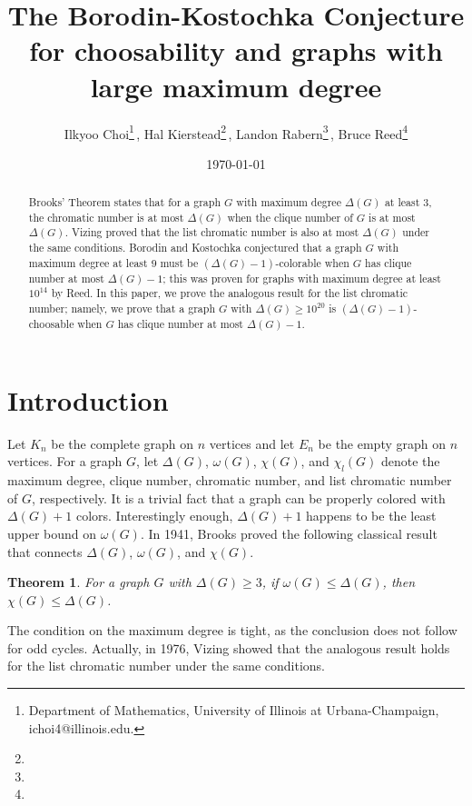\documentclass[12pt]{article}
\newtheorem{theorem}{Theorem}[section]
\theoremstyle{definition}
\begin{document}
\title{The Borodin-Kostochka Conjecture for choosability and graphs with large maximum degree}
\author{
Ilkyoo Choi\thanks{Department of Mathematics, University of Illinois at Urbana-Champaign, ichoi4@illinois.edu.}\,,
Hal Kierstead\thanks{}\,,
Landon Rabern\thanks{}\,,
Bruce Reed\thanks{}
}
\date\today
\maketitle
\begin{abstract}
Brooks' Theorem states that for a graph $G$ with maximum degree $\Delta(G)$ at least $3$, the chromatic number is at most $\Delta(G)$ when the clique number of $G$ is at most $\Delta(G)$. 
Vizing proved that the list chromatic number is also at most $\Delta(G)$ under the same conditions.
Borodin and Kostochka conjectured that a graph $G$ with maximum degree at least $9$ must be $(\Delta(G)-1)$-colorable when $G$ has clique number at most $\Delta(G)-1$;
this was proven for graphs with maximum degree at least $10^{14}$ by Reed.
In this paper, we prove the analogous result for the list chromatic number;
namely, we prove that a graph $G$ with $\Delta(G)\geq 10^{20}$ is $(\Delta(G)-1)$-choosable when $G$ has clique number at most $\Delta(G)-1$. 
\end{abstract}

\section{Introduction}

Let $K_n$ be the complete graph on $n$ vertices and let $E_n$ be the empty graph on $n$ vertices.
For a graph $G$, let $\Delta(G)$, $\omega(G)$, $\chi(G)$, and $\chi_l(G)$ denote the maximum degree, clique number, chromatic number, and list chromatic number of $G$, respectively. 
It is a trivial fact that a graph can be properly colored with $\Delta(G)+1$ colors.
Interestingly enough, $\Delta(G)+1$ happens to be the least upper bound on $\omega(G)$. 
In 1941, Brooks \cite{Br41} proved the following classical result that connects $\Delta(G)$, $\omega(G)$, and $\chi(G)$. 

\begin{theorem}\cite{Br41}
For a graph $G$ with $\Delta(G)\geq 3$, if $\omega(G)\leq \Delta(G)$, then $\chi(G)\leq \Delta(G)$. 
\end{theorem}

The condition on the maximum degree is tight, as the conclusion does not follow for odd cycles. 
Actually, in 1976, Vizing \cite{Vi76} showed that the analogous result holds for the list chromatic number under the same conditions.
\end{document}
